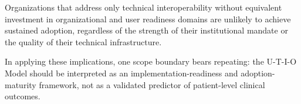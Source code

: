 Organizations that address only technical interoperability without equivalent investment in organizational and user readiness domains are unlikely to achieve sustained adoption, regardless of the strength of their institutional mandate or the quality of their technical infrastructure.

In applying these implications, one scope boundary bears repeating: the U-T-I-O Model should be interpreted as an implementation-readiness and adoption-maturity framework, not as a validated predictor of patient-level clinical outcomes.